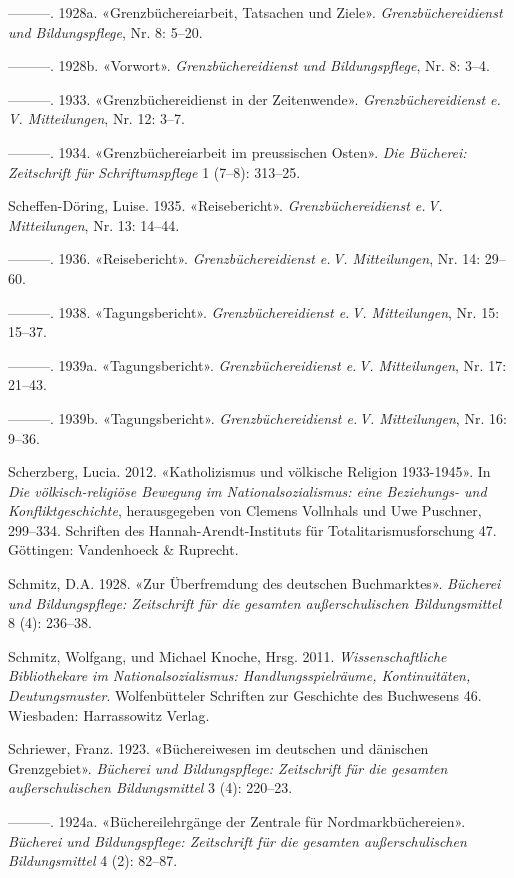 \documentclass[a4paper,
fontsize=11pt,
oneside,
numbers=noperiodatend,
parskip=half-,
bibliography=totoc,
final
]{scrartcl}
\begin{document}
---------. 1928a. «Grenzbüchereiarbeit, Tatsachen und Ziele».
\emph{Grenzbüchereidienst und Bildungspflege}, Nr. 8: 5--20.

---------. 1928b. «Vorwort». \emph{Grenzbüchereidienst und
Bildungspflege}, Nr. 8: 3--4.

---------. 1933. «Grenzbüchereidienst in der Zeitenwende».
\emph{Grenzbüchereidienst e.\,V. Mitteilungen}, Nr. 12: 3--7.

---------. 1934. «Grenzbüchereiarbeit im preussischen Osten». \emph{Die
Bücherei: Zeitschrift für Schriftumspflege} 1 (7--8): 313--25.

Scheffen-Döring, Luise. 1935. «Reisebericht». \emph{Grenzbüchereidienst
e.\,V. Mitteilungen}, Nr. 13: 14--44.

---------. 1936. «Reisebericht». \emph{Grenzbüchereidienst e.\,V.
Mitteilungen}, Nr. 14: 29--60.

---------. 1938. «Tagungsbericht». \emph{Grenzbüchereidienst e.\,V.
Mitteilungen}, Nr. 15: 15--37.

---------. 1939a. «Tagungsbericht». \emph{Grenzbüchereidienst e.\,V.
Mitteilungen}, Nr. 17: 21--43.

---------. 1939b. «Tagungsbericht». \emph{Grenzbüchereidienst e.\,V.
Mitteilungen}, Nr. 16: 9--36.

Scherzberg, Lucia. 2012. «Katholizismus und völkische Religion
1933-1945». In \emph{Die völkisch-reli\-giöse Bewegung im
Nationalsozialismus: eine Beziehungs- und Konfliktgeschichte},
herausgegeben von Clemens Vollnhals und Uwe Puschner, 299--334.
Schriften des Hannah-Arendt-Instituts für Totalitarismusforschung 47.
Göttingen: Vandenhoeck \& Ruprecht.

Schmitz, D.A. 1928. «Zur Überfremdung des deutschen Buchmarktes».
\emph{Bücherei und Bildungspflege: Zeitschrift für die gesamten
außerschulischen Bildungsmittel} 8 (4): 236--38.

Schmitz, Wolfgang, und Michael Knoche, Hrsg. 2011.
\emph{Wissenschaftliche Bibliothekare im Nationalsozialismus:
Handlungsspielräume, Kontinuitäten, Deutungsmuster}. Wolfenbütteler
Schriften zur Geschichte des Buchwesens 46. Wiesbaden: Harrassowitz
Verlag.

Schriewer, Franz. 1923. «Büchereiwesen im deutschen und dänischen
Grenzgebiet». \emph{Bücherei und Bildungspflege: Zeitschrift für die
gesamten außerschulischen Bildungsmittel} 3 (4): 220--23.

---------. 1924a. «Büchereilehrgänge der Zentrale für
Nordmarkbüchereien». \emph{Bücherei und Bildungspflege: Zeitschrift für
die gesamten außerschulischen Bildungsmittel} 4 (2): 82--87.
\end{document}

